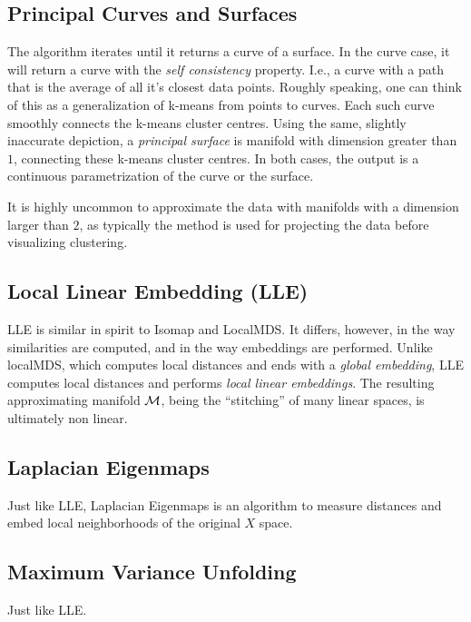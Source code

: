 \documentclass[12pt,a4paper]{article}
\begin{document}
\subsection{Principal Curves and Surfaces}
The algorithm iterates until it returns a curve of a surface.
In the curve case, it will return a curve with the \emph{self consistency} property. 
I.e., a curve with a path that is the average of all it's closest data points.
Roughly speaking, one can think of this as a generalization of k-means from points to curves. 
Each such curve smoothly connects the k-means cluster centres.
Using the same, slightly inaccurate depiction, a \emph{principal surface} is manifold with dimension greater than $1$, connecting these k-means cluster centres.
In both cases, the output is a continuous parametrization of the curve or the surface.

It is highly uncommon to approximate the data with manifolds with a dimension larger than $2$, as typically the method is used for projecting the data before visualizing \andor clustering.






\subsection{Local Linear Embedding (LLE)}
\label{sec:lle}

LLE is similar in spirit to Isomap and LocalMDS.
It differs, however, in the way similarities are computed, and in the way embeddings are performed. 
Unlike localMDS, which computes local distances and ends with a \emph{global embedding}, LLE computes local distances and performs \emph{local linear embeddings}.
The resulting approximating manifold $\mathcal{M}$, being the ``stitching'' of many linear spaces, is ultimately non linear.



\subsection{Laplacian Eigenmaps}
Just like LLE, Laplacian Eigenmaps is an algorithm to measure distances and embed local neighborhoods of the original $X$ space.


\subsection{Maximum Variance Unfolding}
Just like LLE.
\end{document}
